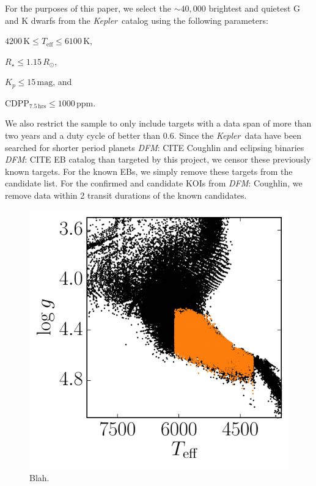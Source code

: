 \documentclass[manuscript, letterpaper]{aastex6}
\newcommand{\project}[1]{\textsl{#1}}
\newcommand{\kepler}{\project{Kepler}}
\newcommand{\paper}{paper}
\newcommand{\figlabel}[1]{\label{fig:#1}}
\newcommand{\unit}[1]{{\ensuremath{\,\mathrm{#1}}}}
\newcommand{\todo}[3]{{\color{#2}\emph{#1}: #3}}
\newcommand{\dfmtodo}[1]{\todo{DFM}{red}{#1}}
\begin{document}
For the purposes of this \paper, we select the $\sim40,000$ brightest and
quietest G and K dwarfs from the \kepler\ catalog using the following
parameters:
\begin{itemize}
{\item $4200\unit{K} \le T_\mathrm{eff} \le 6100\unit{K}$,}
{\item $R_\star \le 1.15\,R_\odot$,}
{\item $K_p \le 15\unit{mag}$, and}
{\item $\mathrm{CDPP}_{7.5\unit{hrs}} \le 1000\unit{ppm}$.}
\end{itemize}
We also restrict the sample to only include targets with a data span of more
than two years and a duty cycle of better than $0.6$.
Since the \kepler\ data have been searched for shorter period planets
\dfmtodo{CITE Coughlin} and eclipsing binaries \dfmtodo{CITE EB catalog} than
targeted by this project, we censor these previously known targets.
For the known EBs, we simply remove these targets from the candidate list.
For the confirmed and candidate KOIs from \dfmtodo{Coughlin}, we remove data
within 2 transit durations of the known candidates.

\begin{figure}
\vspace{\baselineskip}
\begin{center}
\includegraphics{figures/targets.pdf}
\end{center}
\caption{%
Blah.
\figlabel{targets}}
\end{figure}
\end{document}
